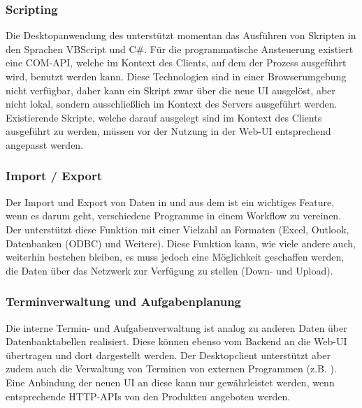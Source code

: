 \subsubsection{Scripting}
Die Desktopanwendung des  unterstützt momentan das Ausführen von Skripten in den Sprachen VBScript und C\#. Für die programmatische Ansteuerung existiert eine \gls{COM}-API, welche im Kontext des Clients, auf dem der Prozess ausgeführt wird, benutzt werden kann. Diese Technologien sind in einer Browserumgebung nicht verfügbar, daher kann ein Skript zwar über die neue UI ausgelöst, aber nicht lokal, sondern ausschließlich im Kontext des Servers ausgeführt werden. Existierende Skripte, welche darauf ausgelegt sind im Kontext des Clients ausgeführt zu werden, müssen vor der Nutzung in der Web-UI entsprechend angepasst werden.

\subsubsection{Import / Export}
Der Import und Export von Daten in und aus dem  ist ein wichtiges Feature, wenn es darum geht, verschiedene Programme in einem Workflow zu vereinen. Der  unterstützt diese Funktion mit einer Vielzahl an Formaten (Excel, Outlook, Datenbanken (ODBC) und Weitere). Diese Funktion kann, wie viele andere auch, weiterhin bestehen bleiben, es muss jedoch eine Möglichkeit geschaffen werden, die Daten über das Netzwerk zur Verfügung zu stellen (Down- und Upload).

\subsubsection{Terminverwaltung und Aufgabenplanung}
Die interne Termin- und Aufgabenverwaltung ist analog zu anderen Daten über Datenbanktabellen realisiert. Diese können ebenso vom Backend an die Web-UI übertragen und dort dargestellt werden. Der Desktopclient unterstützt aber zudem auch die Verwaltung von Terminen von externen Programmen (z.B. ). Eine Anbindung der neuen UI an diese kann nur gewährleistet werden, wenn entsprechende HTTP-APIs von den Produkten angeboten werden.

